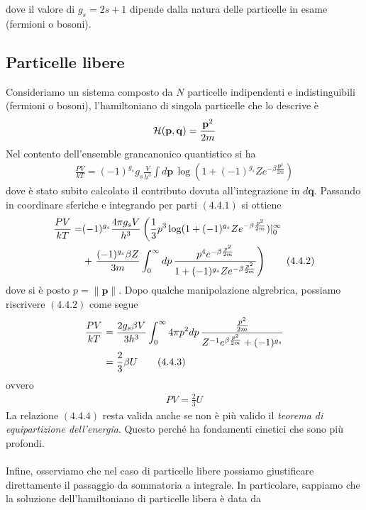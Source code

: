 \documentclass{article}
\begin{document}
dove il valore di $g_s = 2s + 1$ dipende dalla natura delle particelle in esame (fermioni o bosoni).

\newpage
\subsection{Particelle libere}
Consideriamo un sistema composto da $N$ particelle indipendenti e indistinguibili (fermioni o bosoni), l'hamiltoniano di singola particelle che lo descrive è
\begin{align}
    \mathcal{H}(\mathbf{p}, \mathbf{q}) = \frac{\mathbf{p}^2}{2m} \notag
\end{align}
Nel contento dell'ensemble grancanonico quantistico si ha 
\begin{align}
    \frac{PV}{kT} = (-1)^{g_s}g_s\frac{V}{h^3}\int d\mathbf{p} \, \log(1 + (-1)^{g_s}Ze^{-\beta\frac{\mathbf{p}^2}{2m}}) \tag{4.4.1}
\end{align}
dove è stato subito calcolato il contributo dovuta all'integrazione in $d\mathbf{q}$. Passando in coordinare sferiche e integrando per parti $(4.4.1)$ si ottiene
\begin{align}
    \frac{PV}{kT} = &(-1)^{g_s}\frac{4\pi g_sV}{h^3}\left(\frac{1}{3}p^3\log(1 + (-1)^{g_s}Ze^{-\beta\frac{p^2}{2m}})|_0^\infty\right. \notag \\
    &+ \left.\frac{(-1)^{g_s}\beta Z}{3m}\int_0^\infty dp \, \frac{p^4e^{-\beta\frac{p^2}{2m}}}{1 + (-1)^{g_s}Ze^{-\beta\frac{p^2}{2m}}}\right) \tag{4.4.2} 
\end{align}
dove si è posto $p = \|\mathbf{p}\|$. Dopo qualche manipolazione algrebrica, possiamo riscrivere $(4.4.2)$ come segue
\begin{align}
    \frac{PV}{kT} &= \frac{2g_s\beta V}{3h^3}\int_0^\infty 4\pi p^2dp \, \frac{\frac{p^2}{2m}}{Z^{-1}e^{\beta\frac{p^2}{2m}} + (-1)^{g_s}} \notag \\
    &= \frac{2}{3}\beta U \tag{4.4.3}
\end{align}
ovvero 
\begin{align}
    PV = \frac{2}{3}U \tag{4.4.4}
\end{align}
La relazione $(4.4.4)$ resta valida anche se non è più valido il \textit{teorema di equipartizione dell'energia}. Questo perché ha fondamenti cinetici che sono più profondi. \\ \\
Infine, osserviamo che nel caso di particelle libere possiamo giustificare direttamente il passaggio da sommatoria a integrale. In particolare, sappiamo che la soluzione dell'hamiltoniano di particelle libera è data da
\end{document}
